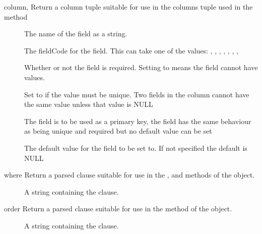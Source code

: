 \documentclass{howto}
\begin{document}
\begin{methoddesc}{column}{, }
Return a column tuple suitable for use in the columns tuple used in the  method
\begin{description}
\item[]
  The name of the field as a string.
\item[]
  The fieldCode for the field. This can take one of the values: , , , , , , , 
\item[]
  Whether or not the field is required. Setting to  means the field cannot have  values.
\item[]
  Set to  if the value must be unique. Two fields in the column cannot have the same value unless that value is NULL
\item[]
  The field is to be used as a primary key, the field has the same behaviour as being unique and required but no default value can be set
\item[]
  The default value for the field to be set to. If not specified the default is NULL 
\end{description}
\end{methoddesc}

\begin{methoddesc}{where}{}
Return a parsed  clause suitable for use in the ,  and  methods of the  object.
\begin{description}
\item[]
A string containing the  clause. 
\end{description}
\end{methoddesc}

\begin{methoddesc}{order}{}
Return a parsed  clause suitable for use in the  method of the  object.
\begin{description}
\item[]
A string containing the  clause. 
\end{description}
\end{methoddesc}
\end{document}
